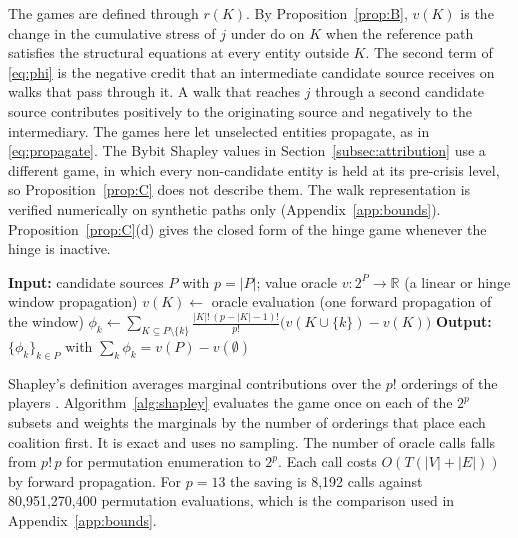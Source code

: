 \documentclass[referee,pdflatex,sn-mathphys-ay]{sn-jnl}
\theoremstyle{thmstyleone}%
\theoremstyle{thmstyletwo}%
\theoremstyle{thmstylethree}%
\newcommand{\doop}{\mathrm{do}}
\begin{document}
The games are defined through $r(K)$. By Proposition~\ref{prop:B}, $v(K)$ is the change in the
cumulative stress of $j$ under $\doop$ on $K$ when the reference path satisfies the structural
equations at every entity outside $K$.
The second term of \eqref{eq:phi} is the negative credit that an intermediate candidate
source receives on walks that pass through it. A walk that reaches $j$ through a second
candidate source contributes positively to the originating source and negatively to the
intermediary. The games here let unselected entities propagate, as in \eqref{eq:propagate}.
The Bybit Shapley values in Section~\ref{subsec:attribution} use a different game, in which every
non-candidate entity is held at its pre-crisis level, so Proposition~\ref{prop:C} does not
describe them. The walk representation is verified numerically on synthetic paths only
(Appendix~\ref{app:bounds}). Proposition~\ref{prop:C}(d) gives the closed form of the hinge game whenever the hinge is inactive.

\begin{algorithm}[tbp]
\caption{Exact subset Shapley attribution}
\label{alg:shapley}
\begin{algorithmic}[1]
\State \textbf{Input:} candidate sources $P$ with $p=|P|$; value oracle $v:2^P\to\mathbb{R}$ (a linear or hinge window propagation)
  \State $v(K)\gets$ oracle evaluation (one forward propagation of the window)
\EndFor
{}
  \State $\phi_k \gets \sum_{K\subseteq P\setminus\{k\}}\frac{|K|!\,(p-|K|-1)!}{p!}\big(v(K\cup\{k\})-v(K)\big)$
\EndFor
\State \textbf{Output:} $\{\phi_k\}_{k\in P}$ with $\sum_k\phi_k=v(P)-v(\emptyset)$
\end{algorithmic}
\end{algorithm}

Shapley's definition averages marginal contributions over the $p!$ orderings of the players \citep{shapley1953value}. Algorithm~\ref{alg:shapley} evaluates the game once on each of the $2^p$ subsets and weights the marginals by the number of orderings that place each coalition first. It is exact and uses no sampling. The number of oracle
calls falls from $p!\,p$ for permutation enumeration to $2^p$. Each call costs
$O(T(|V|+|E|))$ by forward propagation. For $p=13$ the saving is 8{,}192 calls against 80{,}951{,}270{,}400 permutation
evaluations, which is the comparison used in Appendix~\ref{app:bounds}.
\end{document}
